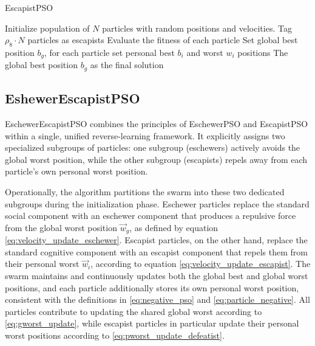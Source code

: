{\vspace{.935em}
\begin{algorithm}[H]
\caption{EscapistPSO}\label{alg:escapist}
Initialize population of \(N\) particles with random positions and velocities. Tag \(\rho_8 \cdot N\) particles as escapists\;
Evaluate the fitness of each particle\;
Set global best position \(b_g\), for each particle set personal best \(b_i\) and worst \(w_i\) positions\;
\Return The global best position \(b_g\) as the final solution\;
\end{algorithm}



\subsection{EshewerEscapistPSO}

EschewerEscapistPSO combines the principles of EschewerPSO and EscapistPSO within a single, unified reverse-learning framework. It explicitly assigns two specialized subgroups of particles: one subgroup (eschewers) actively avoids the global worst position, while the other subgroup (escapists) repels away from each particle’s own personal worst position.

Operationally, the algorithm partitions the swarm into these two dedicated subgroups during the initialization phase. Eschewer particles replace the standard social component with an eschewer component that produces a repulsive force from the global worst position $\vec{w}_g$, as defined by equation \eqref{eq:velocity_update_eschewer}. Escapist particles, on the other hand, replace the standard cognitive component with an escapist component that repels them from their personal worst $\vec{w}_i$, according to equation \eqref{eq:velocity_update_escapist}.
The swarm maintains and continuously updates both the global best and global worst positions, and each particle additionally stores its own personal worst position, consistent with the definitions in \eqref{eq:negative_pso} and \eqref{eq:particle_negative}. All particles contribute to updating the shared global worst according to \eqref{eq:gworst_update}, while escapist particles in particular update their personal worst positions according to \eqref{eq:pworst_update_defeatist}.

}
